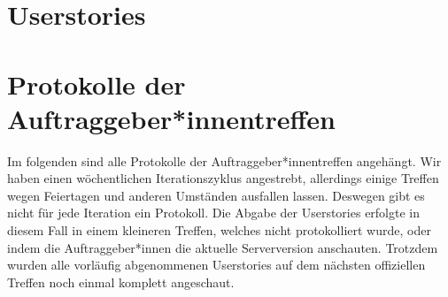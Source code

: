 \documentclass[accentcolor=tud0b,12pt,paper=a4]{tudreport}
\begin{document}
\chapter{Userstories}
	


\chapter{Protokolle der Auftraggeber*innentreffen}

	Im folgenden sind alle Protokolle der Auftraggeber*innentreffen angehängt. Wir haben einen wöchentlichen Iterationszyklus angestrebt, allerdings einige Treffen wegen Feiertagen und anderen Umständen ausfallen lassen. Deswegen gibt es nicht für jede Iteration ein Protokoll. Die Abgabe der Userstories erfolgte in diesem Fall in einem kleineren Treffen, welches nicht protokolliert wurde, oder indem die Auftraggeber*innen die aktuelle Serverversion anschauten. Trotzdem wurden alle vorläufig abgenommenen Userstories auf dem nächsten offiziellen Treffen noch einmal komplett angeschaut.

	
	
	
	
	
	
	
	
	
	
	
	
	
	
	
\end{document}

